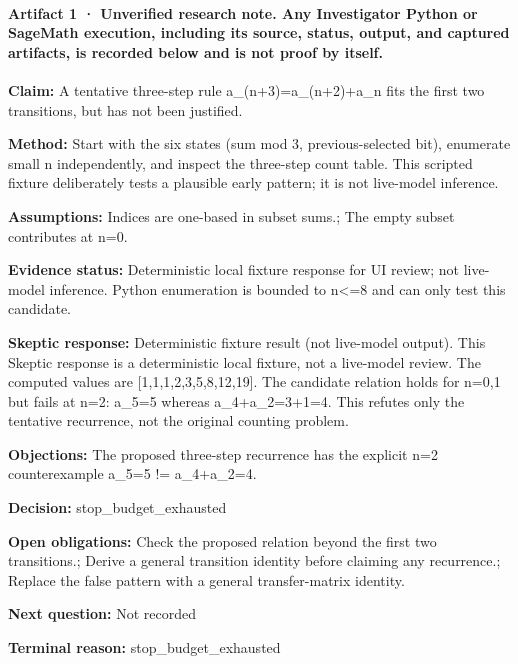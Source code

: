 \documentclass[11pt]{article}
\begin{document}
\paragraph{Artifact 1 · Unverified research note. Any Investigator Python or SageMath execution, including its source, status, output, and captured artifacts, is recorded below and is not proof by itself.}
\textbf{Claim:} A tentative three-step rule a\_(n+3)=a\_(n+2)+a\_n fits the first two transitions, but has not been justified.\par
\textbf{Method:} Start with the six states (sum mod 3, previous-selected bit), enumerate small n independently, and inspect the three-step count table. This scripted fixture deliberately tests a plausible early pattern; it is not live-model inference.\par
\textbf{Assumptions:} Indices are one-based in subset sums.; The empty subset contributes at n=0.\par
\textbf{Evidence status:} Deterministic local fixture response for UI review; not live-model inference. Python enumeration is bounded to n\textless{}=8 and can only test this candidate.\par
\textbf{Skeptic response:} Deterministic fixture result (not live-model output). This Skeptic response is a deterministic local fixture, not a live-model review. The computed values are [1,1,1,2,3,5,8,12,19]. The candidate relation holds for n=0,1 but fails at n=2: a\_5=5 whereas a\_4+a\_2=3+1=4. This refutes only the tentative recurrence, not the original counting problem.\par
\textbf{Objections:} The proposed three-step recurrence has the explicit n=2 counterexample a\_5=5 != a\_4+a\_2=4.\par
\textbf{Decision:} stop\_budget\_exhausted\par
\textbf{Open obligations:} Check the proposed relation beyond the first two transitions.; Derive a general transition identity before claiming any recurrence.; Replace the false pattern with a general transfer-matrix identity.\par
\textbf{Next question:} Not recorded\par
\textbf{Terminal reason:} stop\_budget\_exhausted\par
\end{document}
